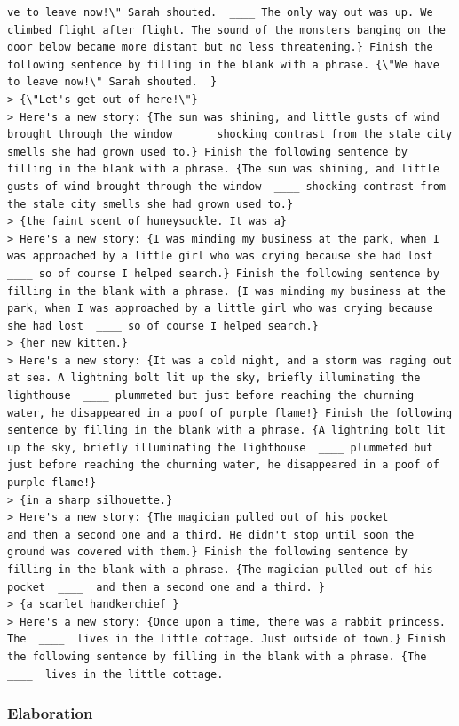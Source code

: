 \begin{verbatim}
ve to leave now!\" Sarah shouted.  ____ The only way out was up. We climbed flight after flight. The sound of the monsters banging on the door below became more distant but no less threatening.} Finish the following sentence by filling in the blank with a phrase. {\"We have to leave now!\" Sarah shouted.  }
> {\"Let's get out of here!\"}
> Here's a new story: {The sun was shining, and little gusts of wind brought through the window  ____ shocking contrast from the stale city smells she had grown used to.} Finish the following sentence by filling in the blank with a phrase. {The sun was shining, and little gusts of wind brought through the window  ____ shocking contrast from the stale city smells she had grown used to.}
> {the faint scent of huneysuckle. It was a}
> Here's a new story: {I was minding my business at the park, when I was approached by a little girl who was crying because she had lost  ____ so of course I helped search.} Finish the following sentence by filling in the blank with a phrase. {I was minding my business at the park, when I was approached by a little girl who was crying because she had lost  ____ so of course I helped search.}
> {her new kitten.}
> Here's a new story: {It was a cold night, and a storm was raging out at sea. A lightning bolt lit up the sky, briefly illuminating the lighthouse  ____ plummeted but just before reaching the churning water, he disappeared in a poof of purple flame!} Finish the following sentence by filling in the blank with a phrase. {A lightning bolt lit up the sky, briefly illuminating the lighthouse  ____ plummeted but just before reaching the churning water, he disappeared in a poof of purple flame!}
> {in a sharp silhouette.}
> Here's a new story: {The magician pulled out of his pocket  ____  and then a second one and a third. He didn't stop until soon the ground was covered with them.} Finish the following sentence by filling in the blank with a phrase. {The magician pulled out of his pocket  ____  and then a second one and a third. }
> {a scarlet handkerchief }
> Here's a new story: {Once upon a time, there was a rabbit princess. The  ____  lives in the little cottage. Just outside of town.} Finish the following sentence by filling in the blank with a phrase. {The  ____  lives in the little cottage.
\end{verbatim}

\subsubsection{Elaboration}
